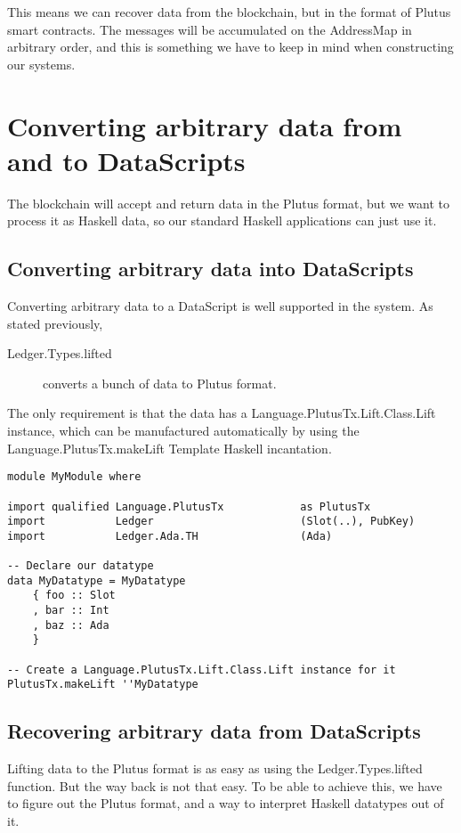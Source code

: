 \documentclass{article}
\begin{document}
This means we can recover data from the blockchain, but in the format of Plutus smart contracts. The messages will be accumulated on the AddressMap in arbitrary order, and this is something we have to keep in mind when constructing our systems.

\section{Converting arbitrary data from and to DataScripts}
The blockchain will accept and return data in the Plutus format, but we want to process it as Haskell data, so our standard Haskell applications can just use it.

\subsection{Converting arbitrary data into DataScripts}
Converting arbitrary data to a DataScript is well supported in the system. As stated previously,

\begin{description}
\item [Ledger.Types.lifted] converts a bunch of data to Plutus format.
\end{description}

The only requirement is that the data has a Language.PlutusTx.Lift.Class.Lift instance, which can be manufactured automatically by using the Language.PlutusTx.makeLift Template Haskell incantation.

\begin{verbatim}
module MyModule where

import qualified Language.PlutusTx            as PlutusTx
import           Ledger                       (Slot(..), PubKey)
import           Ledger.Ada.TH                (Ada)

-- Declare our datatype
data MyDatatype = MyDatatype
    { foo :: Slot
    , bar :: Int
    , baz :: Ada
    }

-- Create a Language.PlutusTx.Lift.Class.Lift instance for it
PlutusTx.makeLift ''MyDatatype
\end{verbatim}

\subsection{Recovering arbitrary data from DataScripts}
Lifting data to the Plutus format is as easy as using the Ledger.Types.lifted function. But the way back is not that easy. To be able to achieve this, we have to figure out the Plutus format, and a way to interpret Haskell datatypes out of it.
\end{document}
